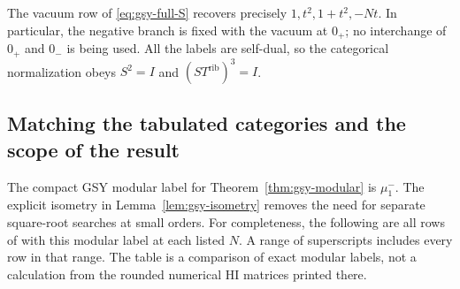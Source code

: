 \documentclass[11pt,a4paper]{article}
\numberwithin{equation}{section}
\theoremstyle{definition}\newtheorem{definition}[theorem]{Definition}
\theoremstyle{remark}\newtheorem{remark}[theorem]{Remark}
\begin{document}
The vacuum row of \eqref{eq:gsy-full-S} recovers precisely
$1,t^2,1+t^2,-Nt$. In particular, the negative branch is fixed
with the vacuum at $0_+$; no interchange of $0_+$ and $0_-$ is
being used. All the labels are self-dual, so the categorical
normalization obeys $S^2=I$ and $(ST^{\mathrm{rib}})^3=I$.

\subsection{Matching the tabulated categories and the scope of the result}
\label{sec:small-comparison}

The compact GSY modular label for Theorem~\ref{thm:gsy-modular} is
$\mu^-_1$. The explicit isometry in Lemma~\ref{lem:gsy-isometry}
removes the need for separate square-root searches at small orders.
For completeness, the following are all rows of
\cite[Appendix F, Table 2]{gsy} with this modular label at each
listed $N$. A range of superscripts includes every row in that range.
The table is a comparison of exact modular labels, not a calculation
from the rounded numerical HI matrices printed there.
\end{document}
